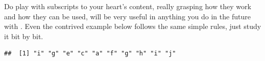 \documentclass[krantz2]{krantz}\usepackage{knitr}
\begin{document}
\begin{playground}
Do play with subscripts to your heart's content, really grasping how they work and how they can be used, will be very useful in anything you do in the future with \Rlang. Even the contrived example below follows the same simple rules, just study it bit by bit.

\begin{knitrout}\footnotesize
{}\color{fgcolor}\begin{kframe}
\begin{alltt}
 \hlkwb{<-} \hlstd{letters[}\hlopt{:}\hlstd{]}
\hlstd{a[}\hlopt{:}\hlstd{]} \hlkwb{<-} \hlstd{a[}\hlstd{(}\hlstd{,}\hlstd{)]}
\end{alltt}
\begin{verbatim}
##  [1] "i" "g" "e" "c" "a" "f" "g" "h" "i" "j"
\end{verbatim}
\end{kframe}
\end{knitrout}

\end{playground}
\end{document}
